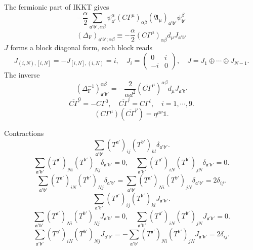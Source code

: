 The fermionic part of IKKT gives
\begin{equation}
	- \frac{\alpha}{2} \sum_{\mathfrak{a}'\mathfrak{b}',\alpha\beta}
	\psi^\alpha_{\mathfrak{a}'}
	(C\Gamma^\mu)_{\alpha\beta}
	(\mathfrak{A}_\mu)_{\mathfrak{a}'\mathfrak{b}'}
	\psi^\beta_{\mathfrak{b}'}
\end{equation}
\begin{equation}
	(\Delta_{\mathrm{F}})_{\mathfrak{a}'\mathfrak{b}';\alpha\beta}
	\equiv - \frac{\alpha}{2} (C\Gamma^\mu)_{\alpha\beta}
	d_\mu J_{\mathfrak{a}'\mathfrak{b}'}
\end{equation}
$J$ forms a block diagonal form, each block reads
\[
	J_{(i,N),[i,N]} = - J_{[i,N],(i,N)} = i,\quad
	J_i = 
	\begin{pmatrix}
		0 & i \\
		-i & 0
	\end{pmatrix},\quad
	J = J_1 \oplus \cdots \oplus J_{N-1}
.\] 
The inverse
\begin{equation}
	(\Delta_{\mathrm{F}}^{-1})^{\alpha\beta}_{\mathfrak{a}'\mathfrak{b}'} 
	= - \frac{2}{\alpha d^2}
	(\overline{C\Gamma}^\mu)^{\alpha\beta} d_\mu J_{\mathfrak{a}'\mathfrak{b}'}
\end{equation}
\[
\overline{C\Gamma}^0 = - C\Gamma^0,\quad
\overline{C\Gamma}^i =  C\Gamma^i,\quad i=1,\cdots,9
.\] 
\[
	(C\Gamma^\mu)(\overline{C\Gamma}^\nu)
	= \eta^{\mu\nu} \mathds{1}
.\] 

Contractions
\[
	\sum_{\mathfrak{a}'\mathfrak{b}'}
	(T^{\mathfrak{a}'})_{ij} (T^{\mathfrak{b}'})_{kl}
	\delta_{\mathfrak{a}'\mathfrak{b}'}
.\] 
\[
	\sum_{\mathfrak{a}'\mathfrak{b}'}
		(T^{\mathfrak{a}'})_{Ni} (T^{\mathfrak{b}'})_{Nj}
			\delta_{\mathfrak{a}'\mathfrak{b}'}
			= 0,\quad
	\sum_{\mathfrak{a}'\mathfrak{b}'}
		(T^{\mathfrak{a}'})_{iN} (T^{\mathfrak{b}'})_{jN}
			\delta_{\mathfrak{a}'\mathfrak{b}'} = 0
.\] 
\[
	\sum_{\mathfrak{a}'\mathfrak{b}'}
			(T^{\mathfrak{a}'})_{iN} (T^{\mathfrak{b}'})_{Nj}
						\delta_{\mathfrak{a}'\mathfrak{b}'}
									=
										\sum_{\mathfrak{a}'\mathfrak{b}'}
												(T^{\mathfrak{a}'})_{Ni} (T^{\mathfrak{b}'})_{jN}
															\delta_{\mathfrak{a}'\mathfrak{b}'}
																		=2\delta_{ij}
.\] 
\[
	\sum_{\mathfrak{a}'\mathfrak{b}'}
	(T^{\mathfrak{a}'})_{ij} (T^{\mathfrak{b}'})_{kl}
	J_{\mathfrak{a}'\mathfrak{b}'}
.\] 
\[
	\sum_{\mathfrak{a}'\mathfrak{b}'}
		(T^{\mathfrak{a}'})_{Ni} (T^{\mathfrak{b}'})_{Nj}
			J_{\mathfrak{a}'\mathfrak{b}'}
			= 0,\quad
	\sum_{\mathfrak{a}'\mathfrak{b}'}
		(T^{\mathfrak{a}'})_{iN} (T^{\mathfrak{b}'})_{jN}
			J_{\mathfrak{a}'\mathfrak{b}'} = 0
.\] 
\[
	\sum_{\mathfrak{a}'\mathfrak{b}'}
			(T^{\mathfrak{a}'})_{iN} (T^{\mathfrak{b}'})_{Nj}
						J_{\mathfrak{a}'\mathfrak{b}'}
									=
										-\sum_{\mathfrak{a}'\mathfrak{b}'}
												(T^{\mathfrak{a}'})_{Ni} (T^{\mathfrak{b}'})_{jN}	J_{\mathfrak{a}'\mathfrak{b}'}
																		=2\delta_{ij}
.\] 

